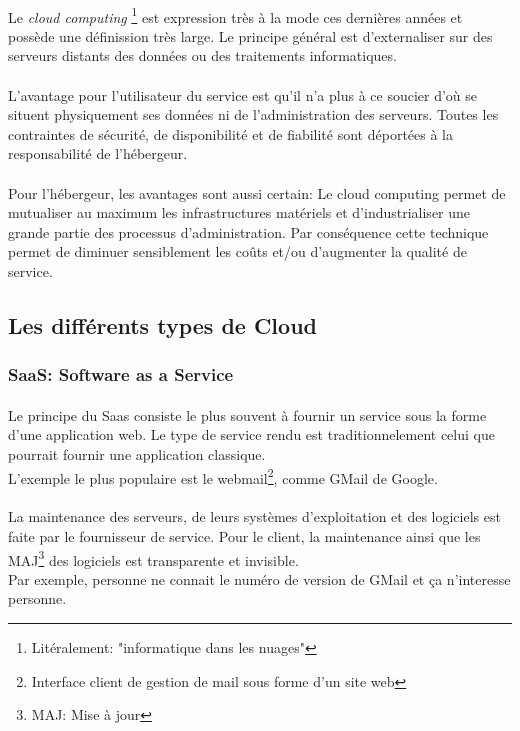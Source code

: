 \paragraph*{}
Le \emph{cloud computing} \footnote{Litéralement: "informatique dans les nuages"} est expression
très à la mode ces dernières années et possède une définission très large.
Le principe général est d'externaliser sur des serveurs distants des données ou
des traitements informatiques.

\paragraph*{}
L'avantage pour l'utilisateur du service est qu'il n'a plus à ce soucier d'où se situent physiquement
ses données ni de l'administration des serveurs. Toutes les contraintes de sécurité, de disponibilité
et de fiabilité sont déportées à la responsabilité de l'hébergeur.

\paragraph*{}
Pour l'hébergeur, les avantages sont aussi certain: Le cloud computing permet de mutualiser au maximum
les infrastructures matériels et d'industrialiser une grande partie des processus d'administration.
Par conséquence cette technique permet de diminuer sensiblement les coûts et/ou d'augmenter la qualité
de service.

\subsection{Les différents types de Cloud}

\subsubsection{SaaS: Software as a Service}
\paragraph*{}
Le principe du Saas consiste le plus souvent à fournir un service sous la forme d'une application web.
Le type de service rendu est traditionnelement celui que pourrait fournir une application classique.
\\
L'exemple le plus populaire est le webmail\footnote{Interface client de gestion de mail sous forme d'un site web}, comme GMail de Google.

\paragraph*{}
La maintenance des serveurs, de leurs systèmes d'exploitation et des logiciels est faite par le fournisseur de service.
Pour le client, la maintenance ainsi que les MAJ\footnote{MAJ: Mise à jour} des logiciels est transparente et invisible.
\\
Par exemple, personne ne connait le numéro de version de GMail et ça n'interesse personne.

